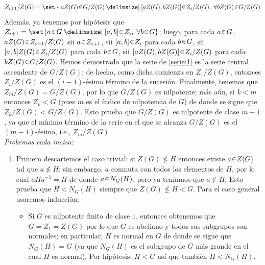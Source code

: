 \begin{sol}[Demostración]
\[
Z_{i+1}/Z(G) = \set*{aZ(G) \en G/Z(G) \given [aZ(G),bZ(G)] \en Z_i/Z(G),\; \forall bZ(G) \en G/Z(G)}
\]
Además, ya tenemos por hipótesis que $Z_{i+1} = \set{a \en G \given [a,b] \en Z_i,\; \forall b \en G}$; luego, para cada $a \en G$, $aZ(G) \en Z_{i+1}/Z(G)$ sii $a \en Z_{i+1}$, sii $[a,b] \en Z_i$ para cada $b \en G$, sii $[a,b]Z(G) \en Z_i/Z(G)$ para cada $b \en G$, sii $[aZ(G),bZ(G)] \en Z_i/Z(G)$ para cada $bZ(G) \en G/Z(G)$. Hemos demostrado que la serie de \eqref{serie:1} es la serie central ascendente de $G/Z(G)$; de hecho, como dicha comienza en $Z_1/Z(G)$, entonces $Z_{i}/Z(G)$ es el $(i-1)\text{-ésimo}$ término de la sucesión. Finalmente, tenemos que $Z_m/Z(G) = G/Z(G)$, por lo que $G/Z(G)$ es nilpotente; más aún, si $k < m$ entonces $Z_k < G$ (pues $m$ es el índice de nilpotencia de $G$) de donde se sigue que $Z_k/Z(G) < G/Z(G)$. Esto prueba que $G/Z(G)$ es nilpotente de clase $m-1$, ya que el mínimo término de la serie en el que se alcanza $G/Z(G)$ es el $(m-1)\text{-ésimo}$, i.e., $Z_m/Z(G)$.\vspace{1em}\\
\emph{Probemos cada inciso:}
\begin{enumerate}[label = (\alph*)]
    \item Primero descartemos el caso trivial: si $Z(G) \nleq H$ entonces existe $a \en Z(G)$ tal que $a \notin H$; sin embargo, $a$ conmuta con todos los elementos de $H$, por lo cual $aHa^{-1} = H$ de donde $a \en N_G(H)$, pero ya teníamos que $a \notin H$. Esto prueba que $H < N_G(H)$ siempre que $Z(G) \nleq H < G$. Para el caso general usaremos inducción:\par
    \begin{itemize}
    \item Si $G$ es nilpotente finito de clase $1$, entonces obtenemos que $G = Z_1 = Z(G)$ por lo que $G$ es abeliano y todos sus subgrupos son normales; en particular, $H$ es normal en $G$ de donde se sigue que $N_G(H) = G$ (ya que $N_G(H)$ es el subgrupo de $G$ más grande en el cual $H$ es normal). Por hipótesis, $H < G$ así que también $H < N_G(H)$.


\end{itemize}
\end{enumerate}
\end{sol}
